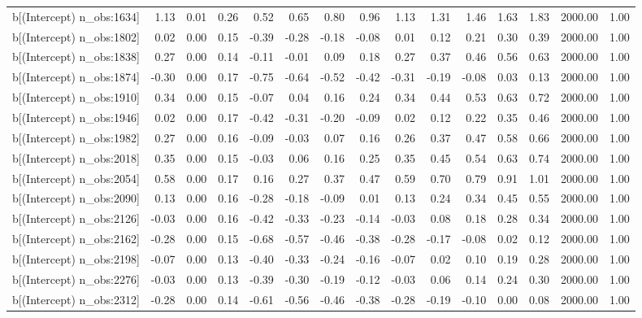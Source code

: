\begin{table}[ht]
\begin{tabular}{rrrrrrrrrrrrrrr}
  b[(Intercept) n\_obs:1634] & 1.13 & 0.01 & 0.26 & 0.52 & 0.65 & 0.80 & 0.96 & 1.13 & 1.31 & 1.46 & 1.63 & 1.83 & 2000.00 & 1.00 \\ 
  b[(Intercept) n\_obs:1802] & 0.02 & 0.00 & 0.15 & -0.39 & -0.28 & -0.18 & -0.08 & 0.01 & 0.12 & 0.21 & 0.30 & 0.39 & 2000.00 & 1.00 \\ 
  b[(Intercept) n\_obs:1838] & 0.27 & 0.00 & 0.14 & -0.11 & -0.01 & 0.09 & 0.18 & 0.27 & 0.37 & 0.46 & 0.56 & 0.63 & 2000.00 & 1.00 \\ 
  b[(Intercept) n\_obs:1874] & -0.30 & 0.00 & 0.17 & -0.75 & -0.64 & -0.52 & -0.42 & -0.31 & -0.19 & -0.08 & 0.03 & 0.13 & 2000.00 & 1.00 \\ 
  b[(Intercept) n\_obs:1910] & 0.34 & 0.00 & 0.15 & -0.07 & 0.04 & 0.16 & 0.24 & 0.34 & 0.44 & 0.53 & 0.63 & 0.72 & 2000.00 & 1.00 \\ 
  b[(Intercept) n\_obs:1946] & 0.02 & 0.00 & 0.17 & -0.42 & -0.31 & -0.20 & -0.09 & 0.02 & 0.12 & 0.22 & 0.35 & 0.46 & 2000.00 & 1.00 \\ 
  b[(Intercept) n\_obs:1982] & 0.27 & 0.00 & 0.16 & -0.09 & -0.03 & 0.07 & 0.16 & 0.26 & 0.37 & 0.47 & 0.58 & 0.66 & 2000.00 & 1.00 \\ 
  b[(Intercept) n\_obs:2018] & 0.35 & 0.00 & 0.15 & -0.03 & 0.06 & 0.16 & 0.25 & 0.35 & 0.45 & 0.54 & 0.63 & 0.74 & 2000.00 & 1.00 \\ 
  b[(Intercept) n\_obs:2054] & 0.58 & 0.00 & 0.17 & 0.16 & 0.27 & 0.37 & 0.47 & 0.59 & 0.70 & 0.79 & 0.91 & 1.01 & 2000.00 & 1.00 \\ 
  b[(Intercept) n\_obs:2090] & 0.13 & 0.00 & 0.16 & -0.28 & -0.18 & -0.09 & 0.01 & 0.13 & 0.24 & 0.34 & 0.45 & 0.55 & 2000.00 & 1.00 \\ 
  b[(Intercept) n\_obs:2126] & -0.03 & 0.00 & 0.16 & -0.42 & -0.33 & -0.23 & -0.14 & -0.03 & 0.08 & 0.18 & 0.28 & 0.34 & 2000.00 & 1.00 \\ 
  b[(Intercept) n\_obs:2162] & -0.28 & 0.00 & 0.15 & -0.68 & -0.57 & -0.46 & -0.38 & -0.28 & -0.17 & -0.08 & 0.02 & 0.12 & 2000.00 & 1.00 \\ 
  b[(Intercept) n\_obs:2198] & -0.07 & 0.00 & 0.13 & -0.40 & -0.33 & -0.24 & -0.16 & -0.07 & 0.02 & 0.10 & 0.19 & 0.28 & 2000.00 & 1.00 \\ 
  b[(Intercept) n\_obs:2276] & -0.03 & 0.00 & 0.13 & -0.39 & -0.30 & -0.19 & -0.12 & -0.03 & 0.06 & 0.14 & 0.24 & 0.30 & 2000.00 & 1.00 \\ 
  b[(Intercept) n\_obs:2312] & -0.28 & 0.00 & 0.14 & -0.61 & -0.56 & -0.46 & -0.38 & -0.28 & -0.19 & -0.10 & 0.00 & 0.08 & 2000.00 & 1.00 \\ 

\end{tabular}
\end{table}
